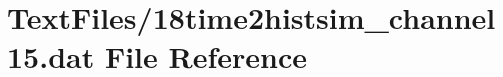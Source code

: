 \hypertarget{18time2histsim__channel15_8dat}{}\section{Text\+Files/18time2histsim\+\_\+channel15.dat File Reference}
\label{18time2histsim__channel15_8dat}
